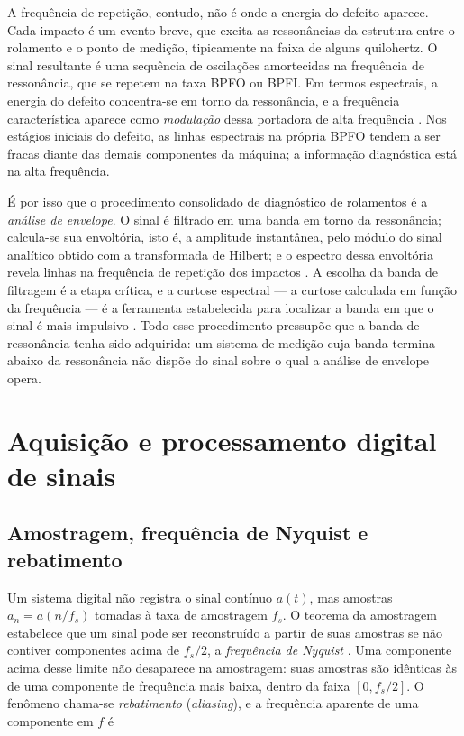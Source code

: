 A frequência de repetição, contudo, não é onde a energia do defeito aparece. Cada impacto é
um evento breve, que excita as ressonâncias da estrutura entre o rolamento e o ponto de
medição, tipicamente na faixa de alguns quilohertz. O sinal resultante é uma sequência de
oscilações amortecidas na frequência de ressonância, que se repetem na taxa BPFO ou BPFI.
Em termos espectrais, a energia do defeito concentra-se em torno da ressonância, e a
frequência característica aparece como \emph{modulação} dessa portadora de alta
frequência \cite{randall2011}. Nos estágios iniciais do defeito, as linhas espectrais na
própria BPFO tendem a ser fracas diante das demais componentes da máquina; a informação
diagnóstica está na alta frequência.

É por isso que o procedimento consolidado de diagnóstico de rolamentos é a \emph{análise de
envelope}. O sinal é filtrado em uma banda em torno da ressonância; calcula-se sua
envoltória, isto é, a amplitude instantânea, pelo módulo do sinal analítico obtido com a
transformada de Hilbert; e o espectro dessa envoltória revela linhas na frequência de
repetição dos impactos \cite{randall2011}. A escolha da banda de filtragem é a etapa
crítica, e a curtose espectral --- a curtose calculada em função da frequência --- é a
ferramenta estabelecida para localizar a banda em que o sinal é mais impulsivo
\cite{antoni2006,antoni2007}. Todo esse procedimento pressupõe que a banda de ressonância
tenha sido adquirida: um sistema de medição cuja banda termina abaixo da ressonância não
dispõe do sinal sobre o qual a análise de envelope opera.

\section{Aquisição e processamento digital de sinais}
\label{sec:fund-sinais}

\subsection{Amostragem, frequência de Nyquist e rebatimento}
\label{sec:fund-amostragem}

Um sistema digital não registra o sinal contínuo $a(t)$, mas amostras
$a_n = a(n/f_s)$ tomadas à taxa de amostragem $f_s$. O teorema da amostragem estabelece
que um sinal pode ser reconstruído a partir de suas amostras se não contiver componentes
acima de $f_s/2$, a \emph{frequência de Nyquist} \cite{brandt2011}. Uma componente acima
desse limite não desaparece na amostragem: suas amostras são idênticas às de uma
componente de frequência mais baixa, dentro da faixa $[0, f_s/2]$. O fenômeno chama-se
\emph{rebatimento} (\emph{aliasing}), e a frequência aparente de uma componente em $f$ é


